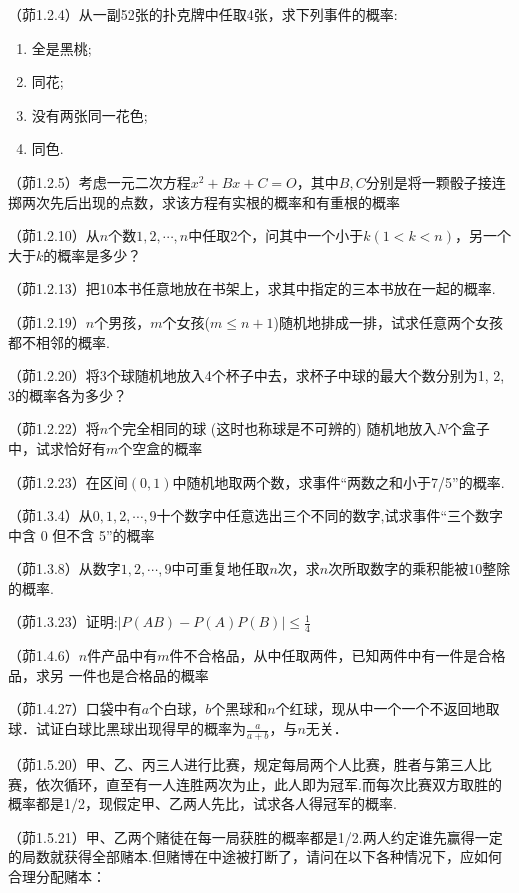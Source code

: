 \begin{problemset}[错题记录]
    \item （茆1.2.4）从一副52张的扑克牌中任取4张，求下列事件的概率:
    \begin{enumerate}
        \item 全是黑桃;
        \item 同花;
        \item 没有两张同一花色;
        \item 同色.
    \end{enumerate}
    \item （茆1.2.5）考虑一元二次方程$x^2+Bx+C=O$，其中$B,C$分别是将一颗骰子接连掷两次先后出现的点数，求该方程有实根的概率和有重根的概率
    \item （茆1.2.10）从$n$个数$1, 2, \cdots, n$中任取2个，问其中一个小于$k (1 < k < n)$，另一个大于$k$的概率是多少？
    \item （茆1.2.13）把10本书任意地放在书架上，求其中指定的三本书放在一起的概率.
    \item （茆1.2.19）$n$个男孩，$m$个女孩($m \le n + 1$)随机地排成一排，试求任意两个女孩都不相邻的概率.
    \item （茆1.2.20）将3个球随机地放入4个杯子中去，求杯子中球的最大个数分别为1, 2, 3的概率各为多少？
    \item （茆1.2.22）将$n$个完全相同的球 (这时也称球是不可辨的) 随机地放入$N$个盒子中，试求恰好有$m$个空盒的概率
    \item （茆1.2.23）在区间$(0,1)$中随机地取两个数，求事件“两数之和小于7/5”的概率.
    \item （茆1.3.4）从$0, 1, 2, \cdots ,9$十个数字中任意选出三个不同的数字,试求事件“三个数字中含 0 但不含 5”的概率
    \item （茆1.3.8）从数字$1, 2, \cdots ,9$中可重复地任取$n$次，求$n$次所取数字的乘积能被$10$整除的概率.
    \item （茆1.3.23）证明:$\lvert P(AB) - P(A)P(B) \rvert \le \frac1{4}$
    \item （茆1.4.6）$n$件产品中有$m$件不合格品，从中任取两件，已知两件中有一件是合格品，求另 一件也是合格品的概率
    \item （茆1.4.27）口袋中有$a$个白球，$b$个黑球和$n$个红球，现从中一个一个不返回地取球．试证白球比黑球出现得早的概率为$\frac{a}{a+b}$，与$n$无关．
    \item （茆1.5.20）甲、乙、丙三人进行比赛，规定每局两个人比赛，胜者与第三人比赛，依次循环，直至有一人连胜两次为止，此人即为冠军.而每次比赛双方取胜的概率都是1/2，现假定甲、乙两人先比，试求各人得冠军的概率.
    \item （茆1.5.21）甲、乙两个赌徒在每一局获胜的概率都是1/2.两人约定谁先赢得一定的局数就获得全部赌本.但赌博在中途被打断了，请问在以下各种情况下，应如何合理分配赌本：

\end{problemset}
